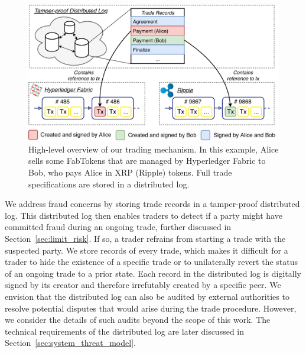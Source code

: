 \begin{figure}[t]
	\centering
	\includegraphics[width=\linewidth]{xchange/assets/xchange}
	\caption{High-level overview of our \ModelName{} trading mechanism. In this example, Alice sells some FabTokens that are managed by Hyperledger Fabric to Bob, who pays Alice in XRP (Ripple) tokens. Full trade specifications are stored in a distributed log.}
	\label{fig:xchange}
\end{figure}

We address fraud concerns by storing trade records in a tamper-proof distributed log.
This distributed log then enables \ModelName{} traders to detect if a party might have committed fraud during an ongoing trade, further discussed in Section~\ref{sec:limit_risk}.
If so, a trader refrains from starting a trade with the suspected party.
We store records of every trade, which makes it difficult for a trader to hide the existence of a specific trade or to unilaterally revert the status of an ongoing trade to a prior state.
Each record in the distributed log is digitally signed by its creator and therefore irrefutably created by a specific peer.
We envision that the distributed log can also be audited by external authorities to resolve potential disputes that would arise during the trade procedure.
However, we consider the details of such audits beyond the scope of this work.
The technical requirements of the distributed log are later discussed in Section~\ref{sec:system_threat_model}.

